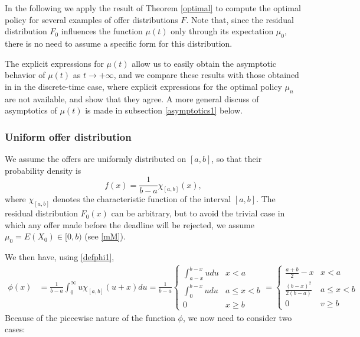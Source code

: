 \documentclass{article}
\numberwithin{equation}{section}
\begin{document}
In the following we apply the result of 
Theorem \ref{optimal} to compute the 
optimal policy
for several examples of offer distributions $F$. Note that, since the
residual distribution $F_0$ 
influences the function $\mu(t)$ 
only through its expectation $\mu_0$, there is no need to assume a specific form for this distribution.

The explicit expressions for $\mu(t)$ 
allow us to easily obtain the asymptotic
behavior of $\mu(t)$ as $t\rightarrow +\infty$, and we compare these results 
with those obtained in \cite{entwistle}
in the discrete-time case, where explicit expressions for the optimal policy $\mu_n$ are not available, and show that they agree. A more general discuss of asymptotics of $\mu(t)$ is made in subsection \ref{asymptotics1} below.


\subsubsection{Uniform offer distribution}
\label{policy_uniform}

We assume the offers are uniformly 
distributed on $[a,b]$, so that 
their probability density is 
\begin{equation}\label{uniform_denisity}f(x)=\frac{1}{b-a}\chi_{[a,b]}(x),\end{equation}
where $\chi_{[a,b]}$ denotes the 
characteristic function of the interval 
$[a,b]$. The residual distribution
$F_0(x)$ can be arbitrary, but to avoid the trivial case in which any offer made before the deadline will be rejected, we assume  $\mu_0=E(X_0)\in [0,b)$ (see \eqref{mM}).

We then have, using \eqref{defphi1}, 
\begin{align}\label{phi_uniform}
	\phi(x)&=\frac{1}{b-a}\int_0^\infty u \chi_{[a,b]}(u+x)du=\frac{1}{b-a}\begin{cases}
		\int_{a-x}^{b-x}udu	&  x<a\\
		\int_{0}^{b-x} u du  &  a\leq x<b\\
		0	  &    x\geq b
	\end{cases}
		=\begin{cases}
			\frac{a+b}{2}-x	&  x<a\\
			\frac{(b-x)^2}{2(b-a)}  &  a\leq x<b\\
			0	  &    v\geq b
		\end{cases}
	\end{align}
	Because of the piecewise nature of the function $\phi$, we now need to 
	consider two cases:
	
\end{document}
